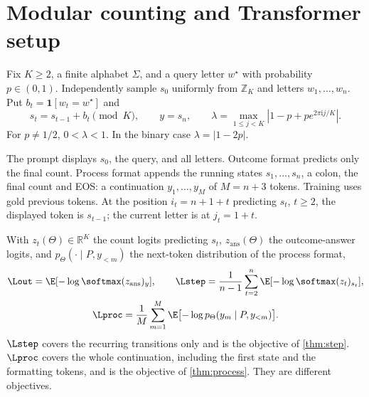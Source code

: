 \section{Modular counting and Transformer setup}\label{sec:setup}\label{sec:setting}
\begin{definition}\label{def:task}\label{def:lambda}
Fix $K\ge2$, a finite alphabet $\Sigma$, and a query letter $w^\star$ with probability $p\in(0,1)$. Independently sample $s_0$ uniformly from $\mathbb Z_K$ and letters $w_1,\ldots,w_n$. Put $b_t=\mathbf1[w_t=w^\star]$ and
\begin{equation}
s_t=s_{t-1}+b_t\pmod K,\qquad y=s_n,\qquad
\lambda=\max_{1\le j<K}|1-p+p e^{2\pi\mathrm i j/K}|.
\label{eq:lambda}
\end{equation}
For $p\ne1/2$, $0<\lambda<1$. In the binary case $\lambda=|1-2p|$.
\end{definition}
The prompt displays $s_0$, the query, and all letters. Outcome format predicts only the final count. Process format appends the running states $s_1,\ldots,s_n$, a colon, the final count and EOS: a continuation $y_1,\ldots,y_M$ of $M=n+3$ tokens. Training uses gold previous tokens. At the position $i_t=n+1+t$ predicting $s_t$, $t\ge2$, the displayed token is $s_{t-1}$; the current letter is at $j_t=1+t$.

\begin{definition}\label{def:losses}
With $z_t(\Theta)\in\mathbb R^K$ the count logits predicting $s_t$, $z_{\mathrm{ans}}(\Theta)$ the outcome-answer logits, and $p_\Theta(\cdot\mid P,y_{<m})$ the next-token distribution of the process format,
\begin{equation}\label{eq:objectives}
\begin{gathered}
\Lout=\E[-\log\softmax(z_{\mathrm{ans}})_y],\qquad
\Lstep=\frac1{n-1}\sum_{t=2}^n\E[-\log\softmax(z_t)_{s_t}],\\
\Lproc=\frac1M\sum_{m=1}^M\E\bigl[-\log p_\Theta(y_m\mid P,y_{<m})\bigr].
\end{gathered}
\end{equation}
$\Lstep$ covers the recurring transitions only and is the objective of \cref{thm:step}. $\Lproc$ covers the whole continuation, including the first state and the formatting tokens, and is the objective of \cref{thm:process}. They are different objectives.
\end{definition}

